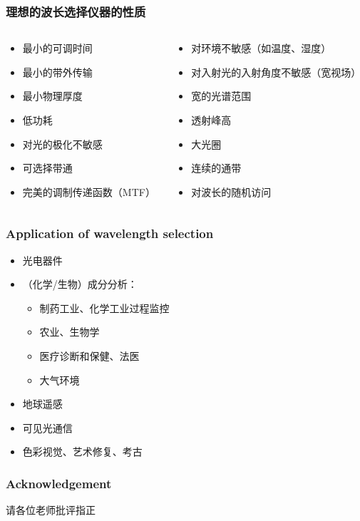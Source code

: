 \begin{frame}[c]
    \frametitle{理想的波长选择仪器的性质}
    \begin{columns}
        \begin{column}{.5\textwidth}
            \begin{itemize}
                \item 最小的可调时间
                \item 最小的带外传输
                \item 最小物理厚度
                \item 低功耗
                \item 对光的极化不敏感
                \item 可选择带通
                \item 完美的调制传递函数（MTF）
            \end{itemize}
        \end{column}
        \begin{column}{.5\textwidth}
            \begin{itemize}
                \item 对环境不敏感（如温度、湿度）
                \item 对入射光的入射角度不敏感（宽视场）
                \item 宽的光谱范围
                \item 透射峰高
                \item 大光圈
                \item 连续的通带
                \item 对波长的随机访问
            \end{itemize}
        \end{column}
    \end{columns}
\end{frame}

\begin{frame}[c]
    \frametitle{Application of wavelength selection}
    \begin{itemize}
        \item 光电器件
        \item （化学/生物）成分分析：\begin{itemize}
                  \item 制药工业、化学工业过程监控
                  \item 农业、生物学
                  \item 医疗诊断和保健、法医
                  \item 大气环境
              \end{itemize}
        \item 地球遥感
        \item 可见光通信
        \item 色彩视觉、艺术修复、考古
    \end{itemize}
\end{frame}

\begin{frame}[c]
    \frametitle{Acknowledgement}
    \Large{\begin{center}
            请各位老师批评指正\\
        \end{center}}
\end{frame}

\printindex
